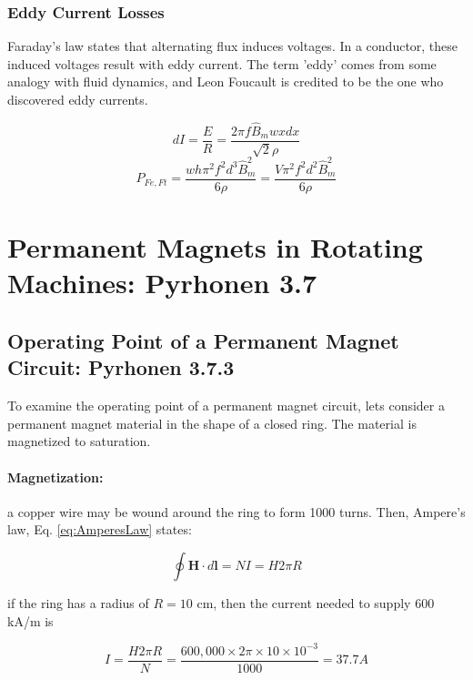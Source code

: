 \subsubsection{Eddy Current Losses}
Faraday's law states that alternating flux induces voltages. In a conductor, these induced voltages result with eddy current. The term 'eddy' comes from some analogy with fluid dynamics, and Leon Foucault is credited to be the one who discovered eddy currents.


\begin{equation}
	dI = \frac{E}{R} = \frac{2 \pi f \hat{B}_m w x dx}{\sqrt{2} \rho}
\end{equation}
\begin{equation}
	P_{Fe,Ft} = \frac{wh \pi^{2} f^{2} d^{3} \hat{B}_{m}^{2}}{6 \rho} = \frac{V \pi^{2} f^{2} d^{2} \hat{B}_{m}^{2}}{6 \rho}
\end{equation}

\section{Permanent Magnets in Rotating Machines: Pyrhonen 3.7}



\subsection{Operating Point of a Permanent Magnet Circuit: Pyrhonen 3.7.3}

To examine the operating point of a permanent magnet circuit, lets consider a permanent magnet material in the shape of a closed ring. The material is magnetized to saturation.


\paragraph{Magnetization:} a copper wire may be wound around the ring to form 1000 turns. Then, Ampere's law, Eq. \ref{eq:AmperesLaw} states:

\begin{equation}
	\oint \textbf{H} \cdot d\textbf{l} = NI = H 2\pi R
\end{equation}

if the ring has a radius of $R=10$ cm, then the current needed to supply $600$ kA/m is

\begin{equation}
	I = \frac{H 2\pi R}{N} = \frac{600,000 \times 2\pi \times 10 \times 10^{-3}}{1000}=37.7A
\end{equation}


